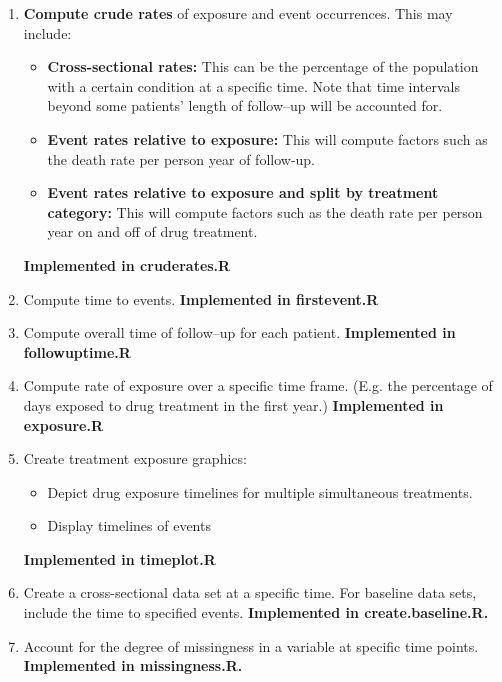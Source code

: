 \documentclass{article}
\begin{document}
\begin{enumerate}
\item \textbf{Compute crude rates} of exposure and event occurrences.  This may include:

\begin{itemize}
\item \textbf{Cross-sectional rates:}  This can be the percentage of the population with a certain condition at a specific time.  Note that time intervals beyond some patients' length of follow--up will be accounted for.

\item \textbf{Event rates relative to exposure:}  This will compute factors such as the death rate per person year of follow-up.

\item \textbf{Event rates relative to exposure and split by treatment category:}  This will compute factors such as the death rate per person year on and off of drug treatment.
\end{itemize}

\textbf{Implemented in cruderates.R}

\item Compute time to events.  \textbf{Implemented in firstevent.R}

\item Compute overall time of follow--up for each patient.  \textbf{Implemented in followuptime.R}

\item Compute rate of exposure over a specific time frame.  (E.g. the percentage of days exposed to drug treatment in the first year.)  \textbf{Implemented in exposure.R}

\item Create treatment exposure graphics:
\begin{itemize}
\item Depict drug exposure timelines for multiple simultaneous treatments.

\item Display timelines of events

\end{itemize}

\textbf{Implemented in timeplot.R}

\item Create a cross-sectional data set at a specific time.  For baseline data sets, include the time to specified events.  \textbf{Implemented in create.baseline.R.}

\item Account for the degree of missingness in a variable at specific time points.  \textbf{Implemented in missingness.R.}


\end{enumerate}
\end{document}
